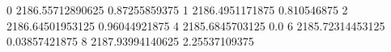 0 2186.55712890625 0.87255859375
1 2186.4951171875 0.810546875
2 2186.64501953125 0.96044921875
4 2185.6845703125 0.0
6 2185.72314453125 0.03857421875
8 2187.93994140625 2.25537109375
